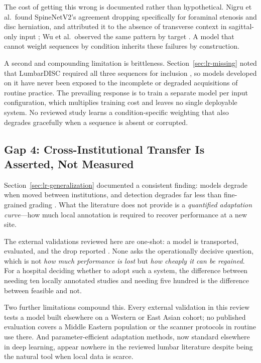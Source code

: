 The cost of getting this wrong is documented rather than hypothetical. Nigru et
al.\ found SpineNetV2's agreement dropping specifically for foraminal stenosis and
disc herniation, and attributed it to the absence of transverse context in
sagittal-only input \cite{nigru2024external}; Wu et al.\ observed the same
pattern by target \cite{wu2026external}. A model that cannot weight sequences by
condition inherits these failures by construction.

A second and compounding limitation is brittleness. Section~\ref{sec:lr-missing}
noted that LumbarDISC required all three sequences for inclusion
\cite{richards2026the}, so models developed on it have never been exposed to the
incomplete or degraded acquisitions of routine practice. The prevailing response
is to train a separate model per input configuration, which multiplies training
cost and leaves no single deployable system. No reviewed study learns a
condition-specific weighting that also degrades gracefully when a sequence is
absent or corrupted.

\subsection{Gap 4: Cross-Institutional Transfer Is Asserted, Not Measured}
\label{sec:lr-gap-transfer}

Section~\ref{sec:lr-generalization} documented a consistent finding: models
degrade when moved between institutions, and detection degrades far less than
fine-grained grading
\cite{zhang2023deep,wu2026external,yilihamu2025quantification}. What the
literature does not provide is a \emph{quantified adaptation curve}---how much
local annotation is required to recover performance at a new site.

The external validations reviewed here are one-shot: a model is transported,
evaluated, and the drop reported
\cite{mcsweeney2023external,nigru2024external,grob2022external,wu2026external}.
None asks the operationally decisive question, which is not \emph{how much
performance is lost} but \emph{how cheaply it can be regained}. For a hospital
deciding whether to adopt such a system, the difference between needing ten
locally annotated studies and needing five hundred is the difference between
feasible and not.

Two further limitations compound this. Every external validation in this review
tests a model built elsewhere on a Western or East Asian cohort; no published
evaluation covers a Middle Eastern population or the scanner protocols in
routine use there. And parameter-efficient adaptation methods, now standard
elsewhere in deep learning, appear nowhere in the reviewed lumbar literature
despite being the natural tool when local data is scarce.

